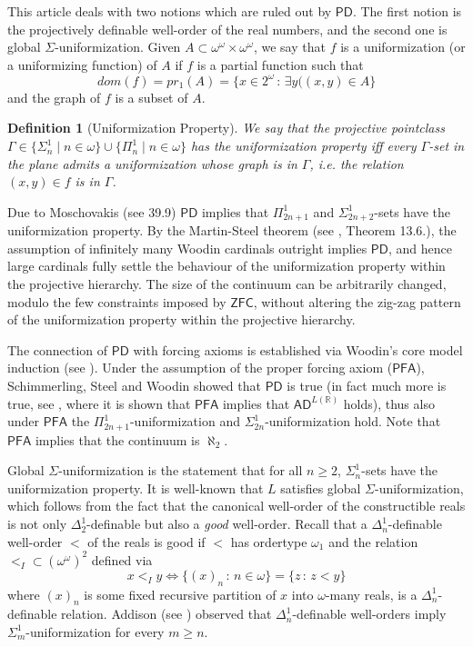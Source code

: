 \documentclass[a4paper,11pt]{article}
\newtheorem{definition}[theorem]{Definition}
\newcommand{\ZFC}{\mathsf{ZFC}}
\newcommand{\PFA}{\mathsf{PFA}}
\newcommand{\PD}{\mathsf{PD}}
\begin{document}
This article deals with two notions which are ruled out by $\PD$. The first notion is the projectively definable well-order of the real numbers, and the second one is global $\Sigma$-uniformization. 
Given $A \subset \omega^{\omega} \times \omega^{\omega}$, we say that $f$ is a uniformization (or a uniformizing function) of
$A$ if $f$ is a partial function such that 
\[dom(f)= pr_1(A)= \{ x \in 2^{\omega} \, : \, \exists y ((x,y) \in A \} \] and the graph of $f$ is a subset of $A$.
\begin{definition}[Uniformization Property]
 We say that the projective pointclass $\Gamma \in \{\Sigma^1_n \mid n \in \omega\} \cup \{\Pi^1_n \mid n \in \omega\}$ has the uniformization
 property iff every $\Gamma$-set in the plane admits a uniformization 
 whose graph is in  $\Gamma$, i.e. the relation $(x,y) \in f$ is in $\Gamma$.
 \end{definition}
 
Due to Moschovakis (see \cite{Kechris} 39.9) $\PD$ implies that $\Pi^1_{2n+1}$ and $\Sigma^1_{2n+2}$-sets have the uniformization property. By the Martin-Steel theorem (see \cite{MS}, Theorem 13.6.), the assumption of infinitely many Woodin cardinals outright implies $\PD$, and hence large cardinals fully settle the behaviour of the uniformization property within the projective hierarchy. The size of the continuum can be arbitrarily changed, modulo the few constraints imposed by $\ZFC$, without altering  the zig-zag pattern of the uniformization property within the projective hierarchy.

The connection of $\PD$ with forcing axioms is established via Woodin's core model induction (see \cite{SchindlerSteel}). Under the assumption of the proper forcing axiom ($\PFA$), Schimmerling, Steel and Woodin showed  that $\PD$ is true (in fact much more is true, see \cite{Steel}, where it is shown that $\PFA$ implies that $\mathsf{AD}^{L(\mathbb{R} ) }$ holds), thus also under $\PFA$ the $\Pi^1_{2n+1}$-uniformization and $\Sigma^1_{2n}$-uniformization hold. Note that $\PFA$ implies that the continuum is $\aleph_2$.
 
 
Global $\Sigma$-uniformization is the statement that for all $n \ge 2$, $\Sigma^1_n$-sets have the uniformization property. It is well-known that $L$ satisfies global $\Sigma$-uniformization, which follows from the fact that the canonical well-order of the constructible reals is not only $\Delta^1_2$-definable but also a \emph{good} well-order. Recall that a $\Delta^1_n$-definable well-order $<$ of the reals is good if $<$ has ordertype $\omega_1$ and the relation $<_{I} \subset (\omega^{\omega})^2$ defined via
\[ x <_I y \Leftrightarrow \{(x)_n \, : \, n \in \omega\}= \{z \, : \, z < y\} \]
where $(x)_n$ is some fixed recursive partition of $x$ into $\omega$-many reals, is a $\Delta^1_n$-definable relation. Addison (see \cite{Addison}) observed that $\Delta^1_n$-definable well-orders imply $\Sigma^1_m$-uniformization for every $m \ge n$.
\end{document}
